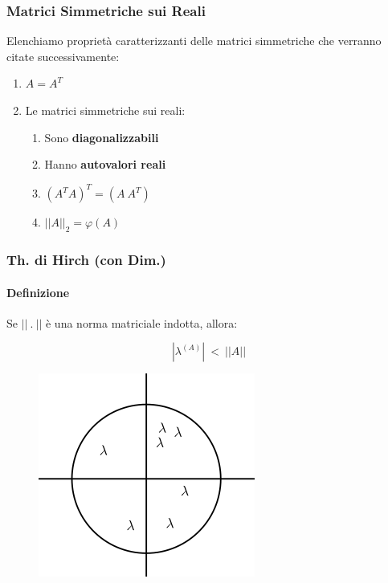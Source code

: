 \documentclass{article}
\begin{document}
\newpage

\subsubsection{Matrici Simmetriche sui Reali}

Elenchiamo proprietà caratterizzanti delle matrici simmetriche che verranno citate successivamente:

\begin{enumerate}
    \item $A = A^T$
    \item Le matrici simmetriche sui reali:
    \begin{enumerate}
        \item Sono \textbf{diagonalizzabili}
        \item Hanno \textbf{autovalori reali}
    \item $(A^TA)^T = (A\:A^T)$
    \item $||A||_2 = \varphi(A)$
    \end{enumerate}
\end{enumerate}

\subsubsection{Th. di Hirch (con Dim.)}

\paragraph{Definizione} Se $||\: .\:||$ è una norma matriciale indotta, allora:

\[ | \lambda^{(A)} | \: < \:||A|| \]


\begin{figure}[htbp]
    \center
    \includegraphics[scale=0.55]{img/th_hirch.png}
\end{figure}
\end{document}
